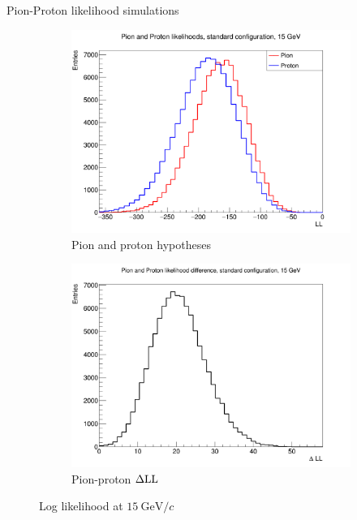 \documentclass{beamer}
\begin{document}
\begin{frame}{Pion-Proton likelihood simulations}
  \begin{figure}
    \centering
    \vspace{-0.2cm}
    \begin{subfigure}{0.5\textwidth}
      \includegraphics[width = 1.0\textwidth]{Plots/ProtonPionLL15GeVStandard.png}
      \caption{Pion and proton hypotheses}
    \end{subfigure}%
    \begin{subfigure}{0.5\textwidth}
      \includegraphics[width = 1.0\textwidth]{Plots/ProtonPionDLL15GeVStandard.png}
      \caption{Pion-proton $\Delta{\rm LL}$}
    \end{subfigure}
    \caption{Log likelihood at $\SI{15}{\giga\eV/c}$}
  \end{figure}
\end{frame}
\end{document}
